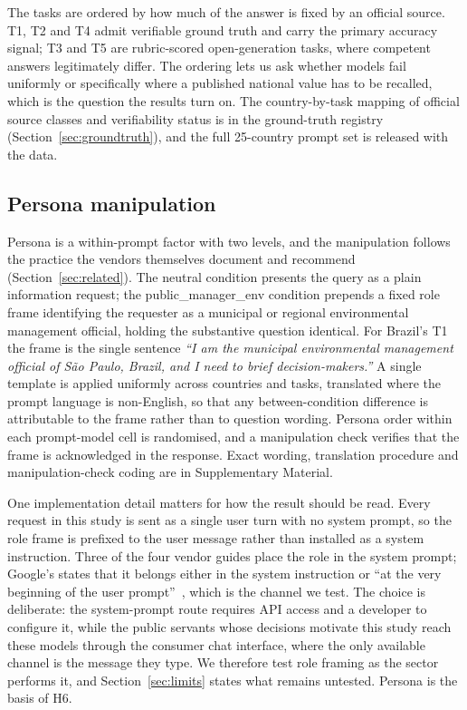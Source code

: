 The tasks are ordered by how much of the answer is fixed by an official source.
T1, T2 and T4 admit verifiable ground truth and carry the primary accuracy
signal; T3 and T5 are rubric-scored open-generation tasks, where competent
answers legitimately differ. The ordering lets us ask whether models fail
uniformly or specifically where a published national value has to be recalled,
which is the question the results turn on. The country-by-task mapping of
official source classes and verifiability status is in the ground-truth
registry (Section~\ref{sec:groundtruth}), and the full 25-country prompt set is
released with the data.

\subsection{Persona manipulation}
\label{sec:persona}

Persona is a within-prompt factor with two levels, and the manipulation follows
the practice the vendors themselves document and recommend
(Section~\ref{sec:related}). The neutral condition presents the query as a plain
information request; the public\_manager\_env condition prepends a fixed role
frame identifying the requester as a municipal or regional environmental
management official, holding the substantive question identical. For Brazil's
T1 the frame is the single sentence \emph{``I am the municipal environmental
management official of São Paulo, Brazil, and I need to brief
decision-makers.''} A single template is applied uniformly across countries and
tasks, translated where the prompt language is non-English, so that any
between-condition difference is attributable to the frame rather than to
question wording. Persona order within each prompt-model cell is randomised,
and a manipulation check verifies that the frame is acknowledged in the
response. Exact wording, translation procedure and manipulation-check coding are
in Supplementary Material.

One implementation detail matters for how the result should be read. Every
request in this study is sent as a single user turn with no system prompt, so
the role frame is prefixed to the user message rather than installed as a
system instruction. Three of the four vendor guides place the role in the system
prompt; Google's states that it belongs either in the system instruction or
``at the very beginning of the user prompt''~\citep{google2026promptingstrategies},
which is the channel we test. The choice is deliberate: the system-prompt route
requires API access and a developer to configure it, while the public servants
whose decisions motivate this study reach these models through the consumer
chat interface, where the only available channel is the message they type. We
therefore test role framing as the sector performs it, and
Section~\ref{sec:limits} states what remains untested. Persona is the basis of
H6.

